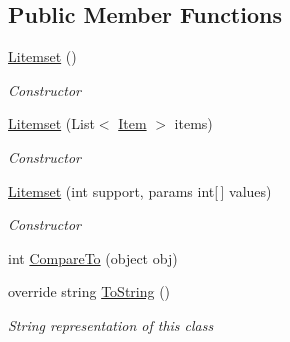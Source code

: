 \subsection*{Public Member Functions}
\begin{DoxyCompactItemize}
\item 
\hyperlink{class_apriori_all_lib_1_1_litemset_af490087265e5b6389f19ce52775e6f35}{Litemset} ()
\begin{DoxyCompactList}\small\item\em Constructor \end{DoxyCompactList}\item 
\hyperlink{class_apriori_all_lib_1_1_litemset_a332a50f3e028dafcf393addcca5f3fb3}{Litemset} (List$<$ \hyperlink{class_apriori_all_lib_1_1_item}{Item} $>$ items)
\begin{DoxyCompactList}\small\item\em Constructor \end{DoxyCompactList}\item 
\hyperlink{class_apriori_all_lib_1_1_litemset_a2f9611a4cc391651629df60ea2e2f3e9}{Litemset} (int support, params int\mbox{[}$\,$\mbox{]} values)
\begin{DoxyCompactList}\small\item\em Constructor \end{DoxyCompactList}\item 
int \hyperlink{class_apriori_all_lib_1_1_litemset_afcbe1c14c38d2638cb48ed9305de5a4e}{Compare\-To} (object obj)
\item 
override string \hyperlink{class_apriori_all_lib_1_1_litemset_a512b70867120363edcd1178cec1c31f9}{To\-String} ()
\begin{DoxyCompactList}\small\item\em String representation of this class \end{DoxyCompactList}\end{DoxyCompactItemize}
